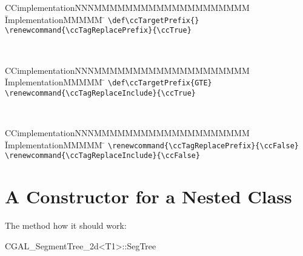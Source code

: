 \documentclass[12pt]{article}
\begin{document}
{{{\begin{tabbing}
  CCimplementationNNNMMMMMMMMMMMMMMMMMMMM \= ImplementationMMMMM \= \kill
  \verb+\def\ccTargetPrefix{}+ \\
  \verb+\renewcommand{\ccTagReplacePrefix}{\ccTrue}+
\end{tabbing}
\def\ccTargetPrefix{}
\renewcommand{\ccTagReplacePrefix}{\ccTrue}
\vspace{-\parskip}

\\
\vspace{-\parskip}

\begin{tabbing}
  CCimplementationNNNMMMMMMMMMMMMMMMMMMMM \= ImplementationMMMMM \= \kill
  \verb+\def\ccTargetPrefix{GTE}+ \\
  \verb+\renewcommand{\ccTagReplaceInclude}{\ccTrue}+
\end{tabbing}
\def\ccTargetPrefix{GTE}
\renewcommand{\ccTagReplaceInclude}{\ccTrue}
\vspace{-\parskip}

\\
\vspace{-\parskip}

\begin{tabbing}
  CCimplementationNNNMMMMMMMMMMMMMMMMMMMM \= ImplementationMMMMM \= \kill
  \verb+\renewcommand{\ccTagReplacePrefix}{\ccFalse}+ \\
  \verb+\renewcommand{\ccTagReplaceInclude}{\ccFalse}+
\end{tabbing}
\renewcommand{\ccTagReplacePrefix}{\ccFalse}
\renewcommand{\ccTagReplaceInclude}{\ccFalse}

\section{A Constructor for a Nested Class}

The method how it should work:

\begin{ccClass}{CGAL_SegmentTree_2d<T1>::SegTree}


\end{ccClass}}}}
\end{document}
